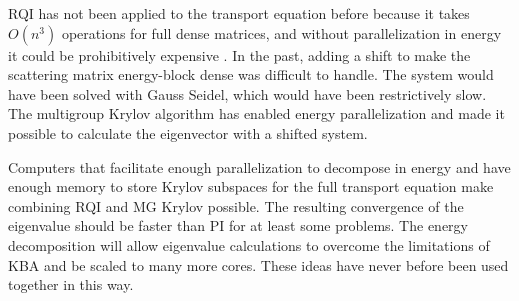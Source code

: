 RQI has not been applied to the transport equation before because it takes $O(n^{3})$ operations for full dense matrices, and without parallelization in energy it could be prohibitively expensive \cite{Stewart2001}. In the past, adding a shift to make the scattering matrix energy-block dense was difficult to handle. The system would have been solved with Gauss Seidel, which would have been restrictively slow. The multigroup Krylov algorithm has enabled energy parallelization and made it possible to calculate the eigenvector with a shifted system.

Computers that facilitate enough parallelization to decompose in energy and have enough memory to store Krylov subspaces for the full transport equation make combining RQI and MG Krylov possible. The resulting convergence of the eigenvalue should be faster than PI for at least some problems. The energy decomposition will allow eigenvalue calculations to overcome the limitations of KBA and be scaled to many more cores. These ideas have never before been used together in this way. 